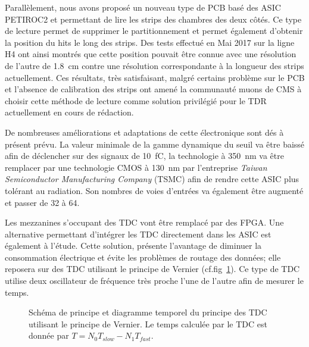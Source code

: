 Parallèlement, nous avons proposé un nouveau type de PCB basé des ASIC PETIROC2 et permettant de lire les strips des chambres des deux côtés. Ce type de lecture permet de supprimer le partitionnement et permet également d'obtenir la position du hits le long des strips. Des tests effectué en Mai 2017 sur la ligne H4 ont ainsi montrés que cette position pouvait être connue avec une résolution de l'autre de \SI{1.8}{\centi\meter} contre une résolution correspondante à la longueur des strips actuellement. Ces résultats, très satisfaisant, malgré certains problème sur le PCB et l'absence de calibration des strips ont amené la communauté muons de CMS à choisir cette méthode de lecture comme solution privilégié pour le TDR actuellement en cours de rédaction.

De nombreuses améliorations et adaptations de cette électronique sont dés à présent prévu. La valeur minimale de la gamme dynamique du seuil va être baissé afin de déclencher sur des signaux de \SI{10}{\femto\coulomb}, la technologie  à \SI{350}{\nano\meter} va être remplacer par une technologie CMOS à \SI{130}{\nano\meter} par l'entreprise \textit{Taiwan Semiconductor Manufacturing Company} (TSMC) afin de rendre cette ASIC plus tolérant au radiation. Son nombres de voies d'entrées va également être augmenté et passer de \num{32} à \num{64}.

Les mezzanines s'occupant des TDC vont être remplacé par des FPGA. Une alternative permettant d'intégrer les TDC directement dans les ASIC est également à l'étude. Cette solution, présente l'avantage de diminuer la consommation électrique et évite les problèmes de routage des données; elle reposera sur des TDC utilisant le principe de Vernier (cf.fig~\ref{vernier}). Ce type de TDC utilise deux oscillateur de fréquence très proche l'une de l'autre afin de mesurer le temps.

\begin{figure}[ht!]
	\centering
	\hfill
	\label{vernier}
	\caption{Schéma de principe et diagramme temporel du principe des TDC utilisant le principe de Vernier. Le temps calculée par le TDC est donnée par $T=N_0T_{slow}-N_1T_{fast}$.}
\end{figure}

